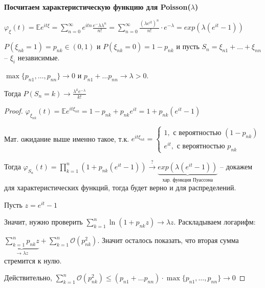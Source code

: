 \begin{example}
    \textbf{Посчитаем характеристическую функцию для Poisson($\lambda$)}

    $\varphi_{\xi} (t) = \mathbb{E} e^{i t \xi} = \sum_{n = 0}^\infty e^{itn} \frac{e^-\lambda \lambda^n}{n!} = \sum_{n = 0}^\infty \frac{(\lambda e^{it})^n}{n!} \cdot e^{-\lambda} = exp (\lambda (e^{it} - 1))$
\end{example}

\begin{theorem}
    $P(\xi_{nk} = 1) = p_{nk} \in (0, 1)$ и $P(\xi_{nk} = 0) = 1 - p_{nk}$ и пусть $S_n = \xi_{n1} + \ldots + \xi_{nn}$ -- $\xi_i$ независимые.

    $\max \{ p_{n1}, \ldots, p_{nn} \} \rightarrow 0$ и $p_{n1} + \ldots p_{nn} \rightarrow \lambda > 0$.

    Тогда $P(S_n = k) \rightarrow \frac{\lambda^k e^{-\lambda}}{k!}$
\end{theorem}

\begin{proof}
    $\varphi_{\xi_{nk}} (t) = \mathbb{E} e^{it\xi_{nk}} = 1 - p_{nk} + p_{nk}e^{it} = 1 + p_{nk} (e^{it} - 1)$

    Мат. ожидание выше именно такое, т.к. $e^{i t \xi_{nk}} = \begin{cases}
        1, \text{ с вероятностью } (1 - p_{nk}) \\
        e^{it}, \text{ с вероятностью } p_{nk}
    \end{cases}$

    Тогда $\varphi_{S_n}(t) = \prod_{k = 1}^n (1 + p_{nk} (e^{it} - 1)) \overset{?}{\rightarrow} \underbrace{exp (\lambda (e^{it} - 1))}_{\text{хар. функция Пуассона}} $ -- докажем для характеристических функций, тогда будет верно и для распределений.

    Пусть $z = e^{it} - 1$

    Значит, нужно проверить $\sum_{k = 1}^n \ln (1 + p_{nk} z) \rightarrow \lambda z$. Раскладываем логарифм:

    $\underbrace{\sum_{k = 1}^n p_{nk} z}_{\rightarrow \lambda z} + \sum_{k = 1}^n \mathcal{O} (p_{nk}^2)$. Значит осталось показать, что вторая сумма стремится к нулю.

    Действительно, $\sum_{k = 1}^n \mathcal{O} (p_{nk}^2) \leqslant (p_{n1} + \ldots p_{nn}) \cdot \max \{ p_{n1}, \ldots, p_{nn} \}  \rightarrow 0$
\end{proof}

